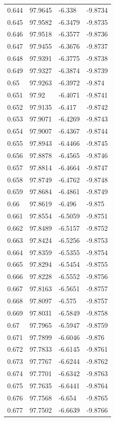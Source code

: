\begin{tabular}{llll}
0.644 & 97.9645 & -6.338 & -9.8734 \\
0.645 & 97.9582 & -6.3479 & -9.8735 \\
0.646 & 97.9518 & -6.3577 & -9.8736 \\
0.647 & 97.9455 & -6.3676 & -9.8737 \\
0.648 & 97.9391 & -6.3775 & -9.8738 \\
0.649 & 97.9327 & -6.3874 & -9.8739 \\
0.65 & 97.9263 & -6.3972 & -9.874 \\
0.651 & 97.92 & -6.4071 & -9.8741 \\
0.652 & 97.9135 & -6.417 & -9.8742 \\
0.653 & 97.9071 & -6.4269 & -9.8743 \\
0.654 & 97.9007 & -6.4367 & -9.8744 \\
0.655 & 97.8943 & -6.4466 & -9.8745 \\
0.656 & 97.8878 & -6.4565 & -9.8746 \\
0.657 & 97.8814 & -6.4664 & -9.8747 \\
0.658 & 97.8749 & -6.4762 & -9.8748 \\
0.659 & 97.8684 & -6.4861 & -9.8749 \\
0.66 & 97.8619 & -6.496 & -9.875 \\
0.661 & 97.8554 & -6.5059 & -9.8751 \\
0.662 & 97.8489 & -6.5157 & -9.8752 \\
0.663 & 97.8424 & -6.5256 & -9.8753 \\
0.664 & 97.8359 & -6.5355 & -9.8754 \\
0.665 & 97.8294 & -6.5454 & -9.8755 \\
0.666 & 97.8228 & -6.5552 & -9.8756 \\
0.667 & 97.8163 & -6.5651 & -9.8757 \\
0.668 & 97.8097 & -6.575 & -9.8757 \\
0.669 & 97.8031 & -6.5849 & -9.8758 \\
0.67 & 97.7965 & -6.5947 & -9.8759 \\
0.671 & 97.7899 & -6.6046 & -9.876 \\
0.672 & 97.7833 & -6.6145 & -9.8761 \\
0.673 & 97.7767 & -6.6244 & -9.8762 \\
0.674 & 97.7701 & -6.6342 & -9.8763 \\
0.675 & 97.7635 & -6.6441 & -9.8764 \\
0.676 & 97.7568 & -6.654 & -9.8765 \\
0.677 & 97.7502 & -6.6639 & -9.8766 \\

\end{tabular}
